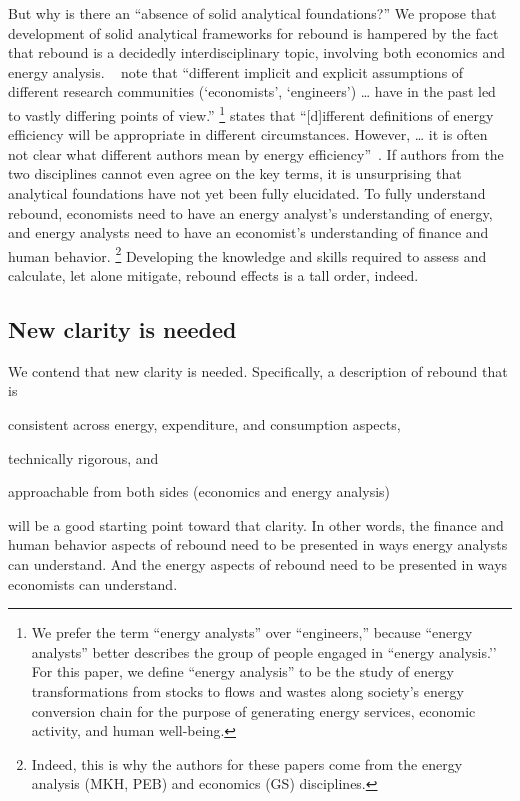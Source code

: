 \documentclass[12pt]{article}\usepackage[]{graphicx}\usepackage[]{xcolor}
\begin{document}
But why is there an ``absence of solid analytical foundations?''
We propose that development of solid analytical frameworks for rebound
is hampered by the fact that rebound is a decidedly interdisciplinary topic,
involving both economics and energy analysis. 
~\citet[p.~458]{Birol:2000wi} note that 
``different implicit and explicit assumptions of different
research communities (`economists', `engineers') \ldots{} have
in the past led to vastly differing points of view.''%
\footnote{
  We prefer the term ``energy analysts'' over ``engineers,'' 
  because ``energy analysts'' better describes 
  the group of people engaged in ``energy analysis.’'
  For this paper, we define ``energy analysis'' to be 
  the study of energy transformations 
  from stocks to flows and wastes 
  along society's energy conversion chain 
  for the purpose of generating 
  energy services, 
  economic activity, and
  human well-being.
}
\citeauthor{Turner:2013aa} states that 
``[d]ifferent definitions of energy efficiency will be appropriate in different circumstances. 
However, \ldots{} it is often not clear what different authors 
mean by energy efficiency''~\citep[p.~237--38]{Turner:2013aa}.
If authors from the two disciplines cannot even agree on the key terms, 
it is unsurprising that
analytical foundations have not yet been fully elucidated.
To fully understand rebound, 
economists need to have an energy analyst's understanding of energy, and 
energy analysts need to have an economist's understanding of finance and human behavior.%
\footnote{
  Indeed, this is why the authors for these papers
  come from the energy analysis (MKH, PEB) and economics (GS) disciplines.
}
%
Developing the knowledge and skills required 
to assess and calculate, 
let alone mitigate, 
rebound effects is a tall order, indeed.


\subsection{New clarity is needed}
\label{sec:clarity_needed}

We contend that new clarity is needed.
Specifically, a description of rebound that is 
%
\begin{enumerate*}[label={(\roman*)}]

  \item consistent across energy, expenditure, and consumption aspects,
  
  \item technically rigorous, and
  
  \item approachable from both sides
        (economics and energy analysis)

\end{enumerate*}
%
will be a good starting point toward that clarity.
In other words, 
the finance and human behavior aspects of rebound need to be presented 
in ways energy analysts can understand. 
And the energy aspects of rebound need to be presented
in ways economists can understand.
\end{document}
